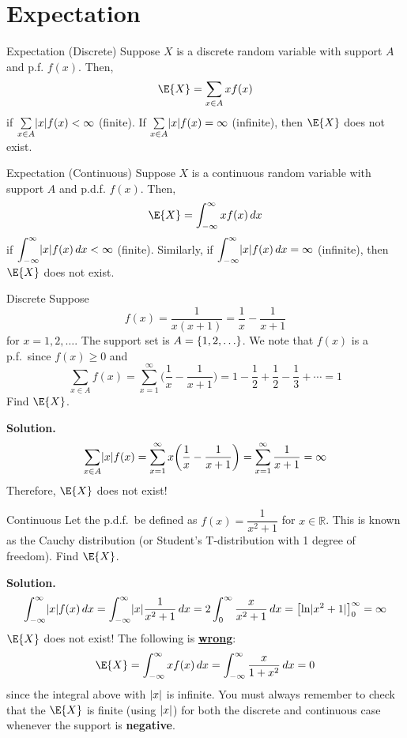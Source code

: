 \section{Expectation}
\begin{Definition}{Expectation (Discrete)}{}
    Suppose $ X $ is a discrete random variable with support
    $ A $ and p.f. $ f(x) $. Then,
    \[ \E{X}=\sum\limits_{x\in A}x f(x)  \]
    if $ \sum\limits_{x\in A}\lvert x\rvert f(x) < \infty $ (finite).
    If $ \sum\limits_{x\in A}\lvert x\rvert f(x) =\infty $ (infinite), then
    $ \E{X} $ does not exist.
\end{Definition}

\begin{Definition}{Expectation (Continuous)}{}
    Suppose $ X $ is a continuous random variable with support $ A $
    and p.d.f. $ f(x) $. Then,
    \[ \E{X}=\int_{-\infty}^{\infty} x f(x)\, d{x}  \]
    if $ \displaystyle \int_{-\infty}^{\infty} \lvert x\rvert f(x)\, d{x} <\infty $
    (finite). Similarly,
    if $ \displaystyle \int_{-\infty}^{\infty} \lvert x\rvert f(x)\, d{x} =\infty $
    (infinite),
    then $ \E{X} $ does not exist.
\end{Definition}

\begin{Example}{Discrete}{}
    Suppose
    \[ f(x)=\frac{1}{x(x+1)}=\frac{1}{x} -\frac{1}{x+1}  \]
    for $ x=1,2,\ldots $. The support set is $ A=\{1,2,\ldots\} $.
    We note that $ f(x) $ is a p.f.\ since
    $ f(x)\ge 0 $ and
    \[ \sum\limits_{x\in A}f(x)=\sum\limits_{x=1}^{\infty}
        \biggl(\frac{1}{x} -\frac{1}{x+1} \biggr)=
        1-\frac{1}{2} +\frac{1}{2} -\frac{1}{3} +\cdots=1  \]
    Find $ \E{X} $.

    \textbf{Solution.}
    \[ \sum\limits_{x\in A}\lvert x\rvert f(x)=\sum\limits_{x=1}^{\infty}
        x\biggl( \frac{1}{x} -\frac{1}{x+1} \biggr)
        =\sum\limits_{x=1}^{\infty} \frac{1}{x+1} =\infty  \]
    Therefore, $ \E{X} $ does not exist!
\end{Example}

\begin{Example}{Continuous}{}
    Let the p.d.f.\ be defined as $ f(x)=\dfrac{1}{x^2+1} $ for
    $ x\in\mathbb{R} $. This is known as the Cauchy distribution
    (or Student's T-distribution with 1 degree of freedom). Find $ \E{X} $.

    \textbf{Solution.}
    \[ \int_{-\infty}^{\infty} \lvert x\rvert f(x)\, d{x} =
        \int_{-\infty}^{\infty} \lvert x\rvert\frac{1}{x^2+1} \, d{x}=
        2 \int_{0}^{\infty} \frac{x}{x^2+1} \, d{x} =
        \bigl[\ln\lvert x^2+1\rvert\bigr]_0^\infty=\infty \]
    $ \E{X} $ does not exist! The following is \underline{\textbf{wrong}}:
    \[ \E{X}=\int_{-\infty}^{\infty}x f(x)\, d{x}=
        \int_{-\infty}^{\infty} \frac{x}{1+x^2} \, d{x}=0  \]
    since the integral above with $ \lvert x\rvert $ is infinite. You must
    always remember to check that the $ \E{X} $ is finite
    (using $ \lvert x\rvert $) for both the discrete and continuous case
    whenever the support is \textbf{negative}.
\end{Example}

